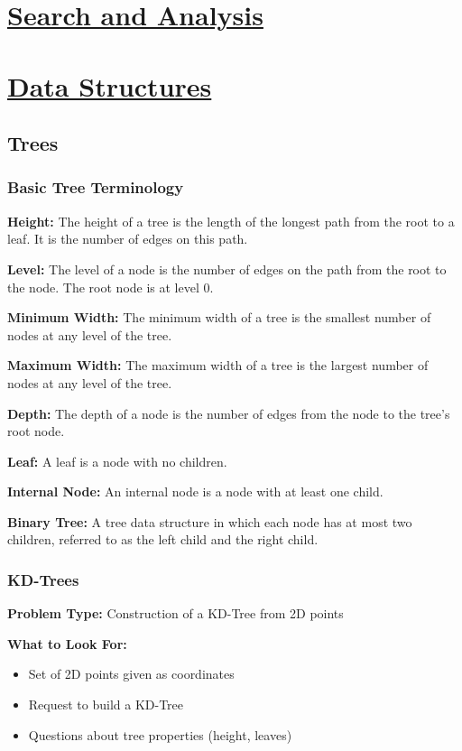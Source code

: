 \clearpage
\section{\texorpdfstring{\underline{Search and Analysis}}{Search and Analysis}}

\clearpage
\section{\texorpdfstring{\underline{Data Structures}}{Data Structures}}
\subsection{Trees}
\subsubsection{Basic Tree Terminology}
\textbf{Height:} The height of a tree is the length of the longest path from the root to a leaf. It is the number of edges on this path.

\textbf{Level:} The level of a node is the number of edges on the path from the root to the node. The root node is at level 0.

\textbf{Minimum Width:} The minimum width of a tree is the smallest number of nodes at any level of the tree.

\textbf{Maximum Width:} The maximum width of a tree is the largest number of nodes at any level of the tree.

\textbf{Depth:} The depth of a node is the number of edges from the node to the tree's root node.

\textbf{Leaf:} A leaf is a node with no children.

\textbf{Internal Node:} An internal node is a node with at least one child.

\textbf{Binary Tree:} A tree data structure in which each node has at most two children, referred to as the left child and the right child.

\subsubsection{KD-Trees}
\textbf{Problem Type:} Construction of a KD-Tree from 2D points

\textbf{What to Look For:}
\begin{itemize}[noitemsep,leftmargin=*]
    \item Set of 2D points given as coordinates
    \item Request to build a KD-Tree
    \item Questions about tree properties (height, leaves)
\end{itemize}

